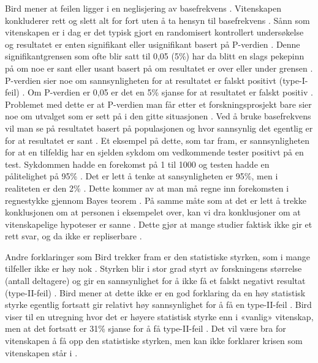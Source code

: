 \documentclass[
]{book}
\begin{document}
Bird mener at feilen ligger i en neglisjering av basefrekvens \citep{bird2020}. Vitenskapen konkluderer rett og slett alt for fort uten å ta hensyn til basefrekvens \citep{bird2020}. Sånn som vitenskapen er i dag er det typisk gjort en randomisert kontrollert undersøkelse og resultatet er enten signifikant eller usignifikant basert på P-verdien \citep{bird2020}. Denne signifikantgrensen som ofte blir satt til 0,05 (5\%) har da blitt en slags pekepinn på om noe er sant eller usant basert på om resultatet er over eller under grensen \citep{bird2020}. P-verdien sier noe om sannsynligheten for at resultatet er falskt positivt (type-I-feil) \citep{bird2020}. Om P-verdien er 0,05 er det en 5\% sjanse for at resultatet er falskt positiv \citep{bird2020}. Problemet med dette er at P-verdien man får etter et forskningsprosjekt bare sier noe om utvalget som er sett på i den gitte situasjonen \citep{bird2020}. Ved å bruke basefrekvens vil man se på resultatet basert på populasjonen og hvor sannsynlig det egentlig er for at resultatet er sant \citep{bird2020}. Et eksempel på dette, som \citet{bird2020} tar fram, er sannsynligheten for at en tilfeldig har en sjelden sykdom om vedkommende tester positivt på en test. Sykdommen hadde en forekomst på 1 til 1000 og testen hadde en pålitelighet på 95\% \citep{bird2020}. Det er lett å tenke at sansynligheten er 95\%, men i realiteten er den 2\% \citep{bird2020}. Dette kommer av at man må regne inn forekomsten i regnestykke gjennom Bayes teorem \citep{bird2020}. På samme måte som at det er lett å trekke konklusjonen om at personen i eksempelet over, kan vi dra konklusjoner om at vitenskapelige hypoteser er sanne \citep{bird2020}. Dette gjør at mange studier faktisk ikke gir et rett svar, og da ikke er repliserbare \citep{bird2020}.

Andre forklaringer som Bird trekker fram er den statistiske styrken, som i mange tilfeller ikke er høy nok \citep{bird2020}. Styrken blir i stor grad styrt av forskningens størrelse (antall deltagere) og gir en sannsynlighet for å ikke få et falskt negativt resultat (type-II-feil) \citep{bird2020}. Bird mener at dette ikke er en god forklaring da en høy statistisk styrke egentlig fortsatt gir relativt høy sannsynlighet for å få en type-II-feil \citep{bird2020}. Bird viser til en utregning hvor det er høyere statistisk styrke enn i «vanlig» vitenskap, men at det fortsatt er 31\% sjanse for å få type-II-feil \citep[s. 12-14]{bird2020}. Det vil være bra for vitenskapen å få opp den statistiske styrken, men kan ikke forklarer krisen som vitenskapen står i \citep{bird2020}.
\end{document}
